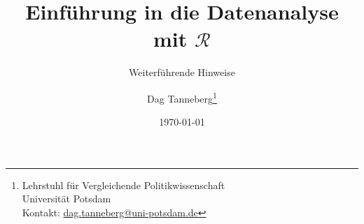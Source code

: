 \usepackage[utf8]{inputenc}
\usepackage{ngerman}
\usepackage{hyperref}
\usepackage{graphicx}

\title{Einführung in die Datenanalyse mit $\mathcal{R}$}
\subtitle{Weiterführende Hinweise}
\author{Dag Tanneberg\thanks{%
  Lehrstuhl für Vergleichende Politikwissenschaft\\
  Universität Potsdam\\%
  Kontakt: \href{mailto:dag.tanneberg@uni-potsdam.de}%
    {dag.tanneberg@uni-potsdam.de}
  }
}
\date{\today}

\hypersetup{colorlinks, urlcolor = red, linkcolor = }
